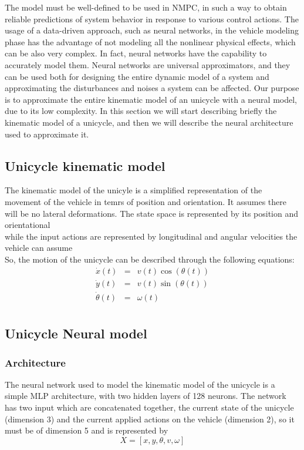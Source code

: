The model must be well-defined to be used in NMPC, in such a way 
to obtain reliable predictions of system behavior in response to various control actions.
The usage of a data-driven approach, such as neural networks, in the vehicle modeling phase has the
advantage of not modeling all the nonlinear physical effects, which can be also very complex.
In fact, neural networks have the capability to accurately model them. 
Neural networks are universal approximators, and they can be used both for designing 
the entire dynamic model of a system and approximating the disturbances and noises 
a system can be affected.
Our purpose is to approximate the entire kinematic model of an unicycle with a neural model,
due to its low complexity. 
In this section we will start describing briefly the kinematic model of a unicycle, and then 
we will describe the neural architecture used to approximate it.

\subsection{Unicycle kinematic model}
The kinematic model of the unicyle is a simplified representation of the movement of the vehicle
in temrs of position and orientation. It assumes there will be no lateral deformations. 
The state space is represented by its position and orientational
\begin{equation}
    [x, y, \theta]
\end{equation} 
while the input actions are represented by longitudinal and angular velocities the vehicle can 
assume
\begin{equation}
    [v, \omega]
\end{equation}
So, the motion of the unicycle can be described through the following equations:
\begin{eqnarray}
    \dot{x}(t) &=& v(t) \cos(\theta(t)) \\
    \dot{y}(t) &=& v(t) \sin(\theta(t)) \\
    \dot{\theta}(t) &=& \omega(t) \\
\end{eqnarray}

\subsection{Unicycle Neural model}
\subsubsection{Architecture}\label{architecture}
The neural network used to model the kinematic model of the unicycle is a simple MLP architecture,
with two hidden layers of 128 neurons. The network has two input which are concatenated together,
the current state of the unicycle (dimension 3) and the current applied actions on the vehicle (dimension 2),
so it must be of dimension 5 and is represented by 
\begin{equation}
    X = [x, y, \theta, v, \omega]
\end{equation}

